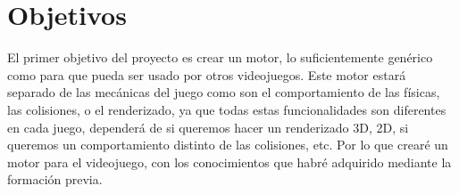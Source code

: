 
\chapter{Objetivos}
\label{objetivos}
El primer objetivo del proyecto es crear un motor, lo suficientemente genérico como para que pueda ser usado por otros videojuegos. Este motor estará separado de las mecánicas del juego como son el comportamiento de las físicas, las colisiones, o el renderizado, ya que todas estas funcionalidades son diferentes en cada juego, dependerá de si queremos hacer un renderizado 3D, 2D, si queremos un comportamiento distinto de las colisiones, etc. Por lo que crearé un motor para el videojuego, con los conocimientos que habré adquirido mediante la formación previa. 

